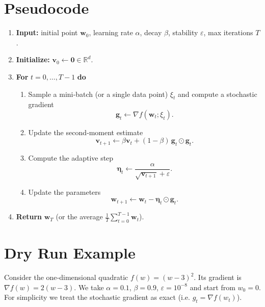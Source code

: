 \documentclass{article}
\begin{document}
\section*{Pseudocode}
\begin{enumerate}[leftmargin=*, label=\textbf{Step \arabic*:}]
\item \textbf{Input:} initial point $\bm w_{0}$, learning rate $\alpha$, decay $\beta$, stability $\varepsilon$, max iterations $T$.
\item \textbf{Initialize:} $\bm v_{0}\gets\bm 0\in\mathbb{R}^{d}$.
\item \textbf{For} $t=0,\dots,T-1$ \textbf{do}
\begin{enumerate}[label=\arabic*.]
\item Sample a mini‑batch (or a single data point) $\xi_{t}$ and compute a stochastic gradient 
\[
\bm g_{t}\gets \nabla f(\bm w_{t};\xi_{t}).
\]
\item Update the second‑moment estimate
\[
\bm v_{t+1}\gets \beta \bm v_{t} + (1-\beta)\,\bm g_{t}\odot\bm g_{t}.
\]
\item Compute the adaptive step
\[
\bm \eta_{t}\gets \frac{\alpha}{\sqrt{\bm v_{t+1}}+\varepsilon}.
\]
\item Update the parameters
\[
\bm w_{t+1}\gets \bm w_{t} - \bm \eta_{t}\odot\bm g_{t}.
\]
\end{enumerate}
\item \textbf{Return} $\bm w_{T}$ (or the average $\frac1T\sum_{t=0}^{T-1}\bm w_{t}$).
\end{enumerate}

\section*{Dry Run Example}
Consider the one‑dimensional quadratic $f(w)=(w-3)^{2}$.  
Its gradient is $\nabla f(w)=2(w-3)$.  
We take $\alpha=0.1$, $\beta=0.9$, $\varepsilon=10^{-8}$ and start from $w_{0}=0$.  
For simplicity we treat the stochastic gradient as exact (i.e. $g_{t}=\nabla f(w_{t})$).
\end{document}

